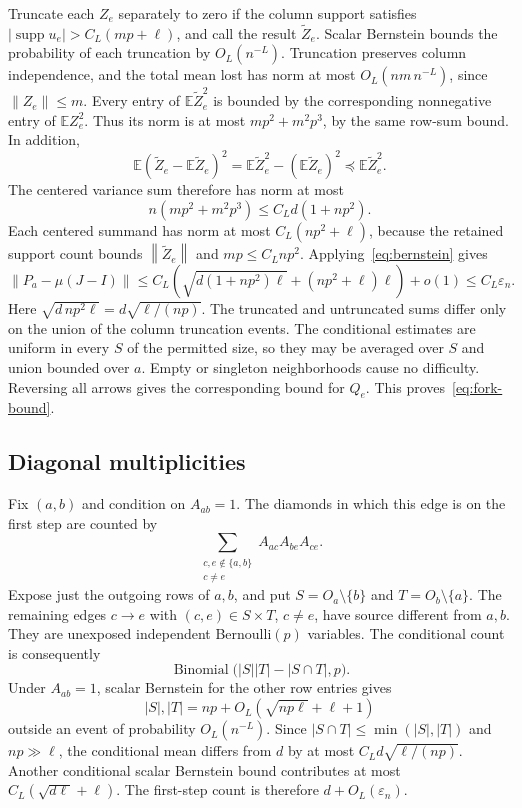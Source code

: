 \documentclass[11pt]{article}
\theoremstyle{remark}
\newcommand{\E}{\mathbb E}
\newcommand{\norm}[1]{\left\lVert#1\right\rVert}
\newcommand{\supp}{\operatorname{supp}}
\begin{document}
Truncate each $Z_e$ separately to zero if the column support satisfies
$|\supp u_e|>C_L(mp+\ell)$, and call the result $\widetilde Z_e$.
Scalar Bernstein bounds the probability of each truncation by
$O_L(n^{-L})$. Truncation preserves column independence, and the total
mean lost has norm at most $O_L(nm\,n^{-L})$, since $\norm{Z_e}\leq m$.
Every entry of $\E\widetilde Z_e^2$ is bounded by the corresponding
nonnegative entry of $\E Z_e^2$. Thus its norm is at most
$mp^2+m^2p^3$, by the same row-sum bound. In addition,
\[
 \E(\widetilde Z_e-\E\widetilde Z_e)^2
 =\E\widetilde Z_e^2-(\E\widetilde Z_e)^2
 \preccurlyeq\E\widetilde Z_e^2.
\]
The centered variance sum therefore has norm at most
\[
 n(mp^2+m^2p^3)\leq C_Ld(1+np^2).
\]
Each centered summand has norm at most $C_L(np^2+\ell)$, because the
retained support count bounds $\norm{\widetilde Z_e}$ and
$mp\leq C_Lnp^2$. Applying~\eqref{eq:bernstein} gives
\begin{equation}\label{eq:fork-deviation}
 \norm{P_a-\mu(J-I)}
 \leq C_L\left(\sqrt{d(1+np^2)\ell}+(np^2+\ell)\ell\right)+o(1)
 \leq C_L\varepsilon_n.
\end{equation}
Here $\sqrt{d\,np^2\ell}=d\sqrt{\ell/(np)}$.
The truncated and untruncated sums differ only on the union of the
column truncation events. The conditional estimates are uniform in
every $S$ of the permitted size, so they may be averaged over $S$ and
union bounded over $a$. Empty or singleton neighborhoods cause no
difficulty. Reversing all arrows gives the corresponding bound for
$Q_e$. This proves~\eqref{eq:fork-bound}.

\subsection{Diagonal multiplicities}

Fix $(a,b)$ and condition on $A_{ab}=1$. The diamonds in which this edge
is on the first step are counted by
\[
 \sum_{\substack{c,e\notin\{a,b\}\\c\ne e}}
             A_{ac}A_{be}A_{ce}.
\]
Expose just the outgoing rows of $a,b$, and put
$S=O_a\setminus\{b\}$ and $T=O_b\setminus\{a\}$.
The remaining edges $c\to e$ with $(c,e)\in S\times T$, $c\ne e$,
have source different from $a,b$. They are unexposed independent
Bernoulli$(p)$ variables. The conditional count is consequently
\[
 \operatorname{Binomial}\bigl(|S||T|-|S\cap T|,p\bigr).
\]
Under $A_{ab}=1$, scalar Bernstein for the other row entries gives
\[
 |S|,|T|=np+O_L(\sqrt{np\ell}+\ell+1)
\]
outside an event of probability $O_L(n^{-L})$.
Since $|S\cap T|\leq\min(|S|,|T|)$ and $np\gg\ell$, the conditional
mean differs from $d$ by at most $C_Ld\sqrt{\ell/(np)}$.
Another conditional scalar Bernstein bound contributes at most
$C_L(\sqrt{d\ell}+\ell)$. The first-step count is therefore
$d+O_L(\varepsilon_n)$.
\end{document}
